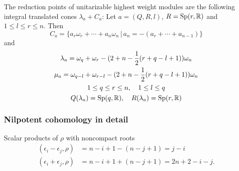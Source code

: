 The reduction points of unitarizable highest weight modules are the following integral translated cones $\lambda_a + C_a$:
Let $a=(Q,R,l)$, $R=\mathrm{Sp}(r,\mathbb{R})$ and $1\leq l \leq r \leq n$. Then
\[
 C_a = \{ a_r\omega_r + \cdots + a_n\omega_n \,|\, a_n=-(a_r+\cdots + a_{n-1}) \}
\]
and
\begin{gather*}
  \lambda_a = \omega_q + \omega_r - (2+n-\frac{1}{2}(r+q-l+1))\omega_n\\
  \mu_a= \omega_{q-l} + \omega_{r-l} - (2+n-\frac{1}{2}(r+q-l+1))\omega_n\\
   1\leq q\leq r\leq n,\quad 1\leq l \leq q\\
   Q(\lambda_a) = \mathrm{Sp}(q,\mathbb{R}),\quad R(\lambda_a)= \mathrm{Sp}(r,\mathbb{R})
\end{gather*}

\subsubsection{Nilpotent cohomology in detail}

Scalar products of $\rho$ with noncompact roots
\begin{align*}
 (\epsilon_i - \epsilon_j, \rho ) & = n-i+1 - (n-j+1) = j - i \\
 (\epsilon_i + \epsilon_j, \rho ) & = n-i+1 + (n-j+1) = 2n+2-i-j.
\end{align*}


